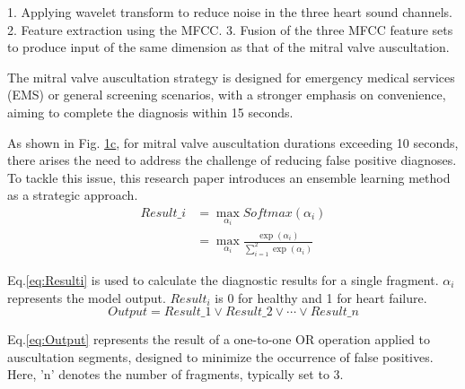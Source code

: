 1. Applying wavelet transform to reduce noise in the three heart sound channels.
2. Feature extraction using the MFCC.
3. Fusion of the three MFCC feature sets to produce input of the same dimension as that of the mitral valve auscultation.

The mitral valve auscultation strategy is designed for emergency medical services (EMS) or general screening scenarios, with a stronger emphasis on convenience, aiming to complete the diagnosis within 15 seconds.

As shown in Fig. \hyperref[FIG:Methodology]{1c}, for mitral valve auscultation durations exceeding 10 seconds, there arises the need to address the challenge of reducing false positive diagnoses. To tackle this issue, this research paper introduces an ensemble learning method as a strategic approach.
\begin{equation}
\begin{split}
Result\_i&= \max \limits_{\alpha_{i}}Softmax(\alpha_{i}) \\
&= \max \limits_{\alpha_{i}}\frac{\exp(\alpha_{i})}{\sum_{i=1}^{2} \exp(\alpha_{i})}
	\label{eq:Resulti}
\end{split}
\end{equation} 

Eq.\ref{eq:Resulti} is used to calculate the diagnostic results for a single fragment. $\alpha_{i}$ represents the model output. $Result_{i}$ is 0 for healthy and 1 for heart failure.
\begin{equation}
Output = Result\_1 \lor Result\_2 \lor \cdots \lor Result\_n
\label{eq:Output}
\end{equation} 

Eq.\ref{eq:Output} represents the result of a one-to-one OR operation applied to auscultation segments, designed to minimize the occurrence of false positives. Here, 'n' denotes the number of fragments, typically set to 3.